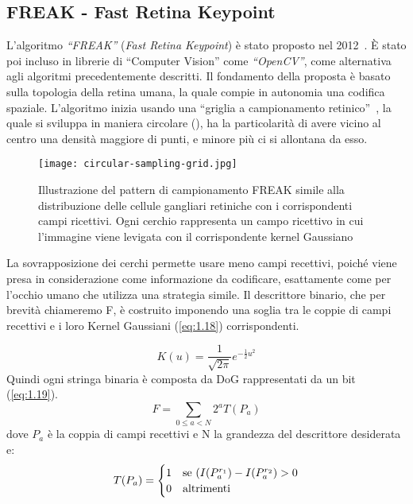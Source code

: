 \subsection{FREAK - Fast Retina Keypoint}
\noindent L'algoritmo \textit{``FREAK''} (\textit{Fast Retina Keypoint}) è stato proposto nel 2012~\cite{6247715}. È stato poi incluso in librerie di ``Computer Vision'' come \textit{``OpenCV''}, come alternativa agli algoritmi precedentemente descritti. Il fondamento della proposta è basato sulla topologia della retina umana, la quale compie in autonomia una codifica spaziale. L'algoritmo inizia usando una ``griglia a campionamento retinico''~\cite{6247715}, la quale si sviluppa in maniera circolare (), ha la particolarità di avere vicino al centro una densità maggiore di punti, e minore più ci si allontana da esso.
\begin{figure}[H]
    \centering
    \texttt{[image: circular-sampling-grid.jpg]}
    \caption{Illustrazione del pattern di campionamento FREAK simile alla distribuzione delle cellule gangliari retiniche con i corrispondenti campi ricettivi. Ogni cerchio rappresenta un campo ricettivo in cui l'immagine viene levigata con il corrispondente kernel Gaussiano~\cite{6247715}}
    \label{fig:5}
\end{figure}
\noindent La sovrapposizione dei cerchi permette usare meno campi recettivi, poiché viene presa in considerazione come informazione da codificare, esattamente come per l'occhio umano che utilizza una strategia simile. Il descrittore binario, che per brevità chiameremo F, è costruito imponendo una soglia tra le coppie di campi recettivi e i loro Kernel Gaussiani (\ref{eq:1.18}) corrispondenti. \par
\begin{equation}
    {\displaystyle K(u)={\frac {1}{\sqrt {2\pi }}}e^{-{\frac {1}{2}}u^{2}}} \label{eq:1.18}
\end{equation}
\noindent Quindi ogni stringa binaria è composta da DoG rappresentati da un bit (\ref{eq:1.19}).
\begin{equation}
    F=\sum_{0\leq a < N}2^{a}T(P_{a}) \label{eq:1.19}
\end{equation}
\noindent dove \textit{\(P_{a}\)} è la coppia di campi recettivi e N la grandezza del descrittore desiderata e:
\begin{equation}
    T(P_{a})=\begin{cases}
       1 & \text{se \( (I(P_{a}^{r_{1}})-I(P_{a}^{r_{2}}) > 0 \)}  \\
       0 & \text{altrimenti}
    \end{cases}
\end{equation}
